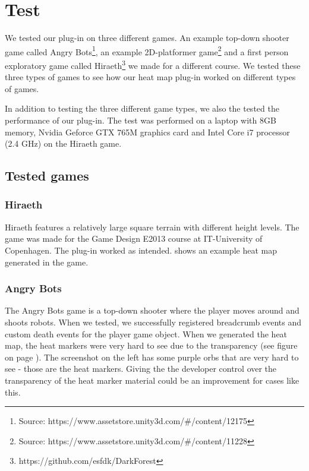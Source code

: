 \section{Test}
\label{Test}
We tested our plug-in on three different games. An example top-down shooter game called Angry Bots\footnote{Source: https://www.assetstore.unity3d.com/\#/content/12175}, an example 2D-platformer game\footnote{Source: https://www.assetstore.unity3d.com/\#/content/11228} and a first person exploratory game called Hiraeth\footnote{https://github.com/esfdk/DarkForest} we made for a different course. We tested these three types of games to see how our heat map plug-in worked on different types of games. 

In addition to testing the three different game types, we also the tested the performance of our plug-in. The test was performed on a laptop with 8GB memory, Nvidia Geforce GTX 765M graphics card and Intel Core i7 processor (2.4 GHz) on the Hiraeth game.

\subsection{Tested games}
\label{Test_TG}
\subsubsection{Hiraeth}
\label{Test_TG_H}


Hiraeth features a relatively large square terrain with different height levels. The game was made for the Game Design E2013 course at IT-University of Copenhagen. The plug-in worked as intended.  shows an example heat map generated in the game.

\subsubsection{Angry Bots}
\label{Test_TG_AB}
The Angry Bots game is a top-down shooter where the player moves around and shoots robots. When we tested, we successfully registered breadcrumb events and custom death events for the player game object. When we generated the heat map, the heat markers were very hard to see due to the transparency (see figure  on page \pageref{fig:AB_01}). The screenshot on the left has some purple orbs that are very hard to see - those are the heat markers. 
Giving the the developer control over the transparency of the heat marker material could be an improvement for cases like this.

